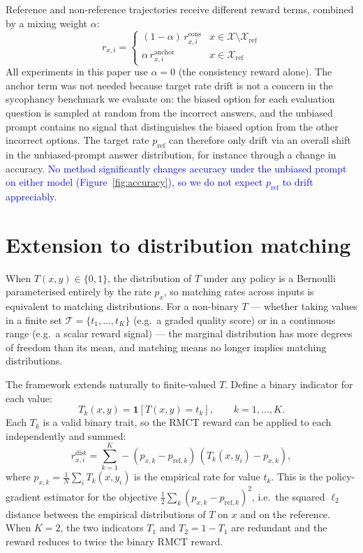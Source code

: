 Reference and non-reference trajectories receive different reward terms,
combined by a mixing weight $\alpha$:
\begin{equation}
r_{x,i} =
\begin{cases}
(1-\alpha)\, r^{\text{cons}}_{x,i} & x \in \mathcal{X} \setminus \mathcal{X}_{\text{ref}} \\
\alpha\, r^{\text{anchor}}_{x,i} & x \in \mathcal{X}_{\text{ref}}
\end{cases}
\end{equation}
All experiments in this paper use $\alpha = 0$ (the consistency reward alone). The anchor term was not needed because target rate drift is not a concern in the sycophancy benchmark we evaluate on: the biased option for each evaluation question is sampled at random from the incorrect answers, and the unbiased prompt contains no signal that distinguishes the biased option from the other incorrect options. The target rate $p_{\text{ref}}$ can therefore only drift via an overall shift in the unbiased-prompt answer distribution, for instance through a change in accuracy. \textcolor{blue}{No method significantly changes accuracy under the unbiased prompt on either model (Figure~\ref{fig:accuracy}), so we do not expect $p_{\text{ref}}$ to drift appreciably.}

\FloatBarrier
\section{Extension to distribution matching}
\label{app:distribution-matching}

When $T(x, y) \in \{0,1\}$, the distribution of $T$ under any policy is a Bernoulli parameterised entirely by the rate $p_x$, so matching rates across inputs is equivalent to matching distributions. For a non-binary $T$ — whether taking values in a finite set $\mathcal{T} = \{t_1, \ldots, t_K\}$ (e.g.\ a graded quality score) or in a continuous range (e.g.\ a scalar reward signal) — the marginal distribution has more degrees of freedom than its mean, and matching means no longer implies matching distributions.

The framework extends naturally to finite-valued $T$. Define a binary indicator for each value:
\begin{equation}
T_k(x, y) = \mathbf{1}[T(x, y) = t_k], \qquad k = 1, \ldots, K.
\end{equation}
Each $T_k$ is a valid binary trait, so the RMCT reward can be applied to each independently and summed:
\begin{equation}
r^{\text{dist}}_{x,i} = \sum_{k=1}^{K} -(p_{x,k} - p_{\text{ref},k})\,(T_k(x, y_i) - p_{x,k}),
\end{equation}
where $p_{x,k} = \frac{1}{N}\sum_i T_k(x, y_i)$ is the empirical rate for value $t_k$. This is the policy-gradient estimator for the objective $\frac{1}{2}\sum_k (p_{x,k} - p_{\text{ref},k})^2$, i.e.\ the squared $\ell_2$ distance between the empirical distributions of $T$ on $x$ and on the reference. When $K=2$, the two indicators $T_1$ and $T_2 = 1 - T_1$ are redundant and the reward reduces to twice the binary RMCT reward.

